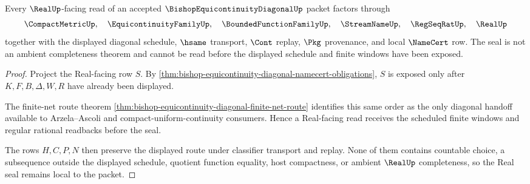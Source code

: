 \begin{theorem}
\label{thm:bishop-equicontinuity-diagonal-real-seal}
Every $\RealUp$-facing read of an accepted $\BishopEquicontinuityDiagonalUp$ packet factors through
$$
\CompactMetricUp,\quad
\EquicontinuityFamilyUp,\quad
\BoundedFunctionFamilyUp,\quad
\StreamNameUp,\quad
\RegSeqRatUp,\quad
\RealUp
$$
together with the displayed diagonal schedule, $\hsame$ transport, $\Cont$ replay, $\Pkg$ provenance, and local $\NameCert$ row. The seal is not an ambient completeness theorem and cannot be read before the displayed schedule and finite windows have been exposed.
\end{theorem}
\begin{proof}
Project the Real-facing row $S$. By \autoref{thm:bishop-equicontinuity-diagonal-namecert-obligations}, $S$ is exposed only after $K,F,B,\Delta,W,R$ have already been displayed.

The finite-net route theorem \autoref{thm:bishop-equicontinuity-diagonal-finite-net-route} identifies this same order as the only diagonal handoff available to Arzela--Ascoli and compact-uniform-continuity consumers. Hence a Real-facing read receives the scheduled finite windows and regular rational readbacks before the seal.

The rows $H,C,P,N$ then preserve the displayed route under classifier transport and replay. None of them contains countable choice, a subsequence outside the displayed schedule, quotient function equality, host compactness, or ambient $\RealUp$ completeness, so the Real seal remains local to the packet.
\end{proof}



